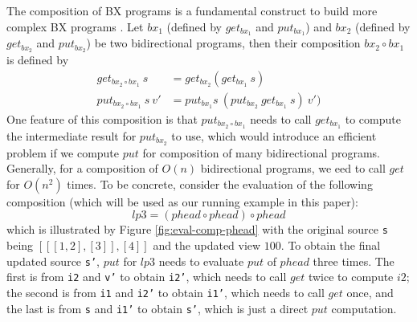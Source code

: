 The composition of BX programs is a fundamental construct to build more complex BX programs \cite{Bohannon06relationallenses:, Bohannon:2008:BRL:1328438.1328487}. Let $bx_1$ (defined by $get_{bx_1}$ and $put_{bx_1}$) and $bx_2$ (defined by $get_{bx_2}$ and $put_{bx_2}$) be two bidirectional programs, then their composition $bx_2 \circ bx_1$ is defined by
\begin{align}
get_{bx_2 \circ bx_1}~s &= get_{bx_2} (get_{bx_1}~s)\\
put_{bx_2 \circ bx_1}~s~v' &= put_{bx_1} s~(put_{bx_2}~ get_{bx_1}~s)~v')
\end{align}
One feature of this composition is that $put_{bx_2 \circ bx_1}$ needs to call $get_{bx_1}$ to compute the intermediate result for $put_{bx_2}$ to use, which would introduce an efficient problem if we compute $put$ for composition of many bidirectional programs. Generally, for a composition of $O(n)$ bidirectional programs, we eed to call $get$ for $O(n^2)$ times. To be concrete, consider the evaluation of the following composition (which will be used as our running example in this paper):
\[
lp3 = (phead \circ phead) \circ phead
\]
which is illustrated by Figure \ref{fig:eval-comp-phead} with the original source \texttt{s} being ${[[[1,2],[3]],[4]]}$ and the updated view ${100}$.
To obtain the final updated source \texttt{s'}, $put$ for $lp3$ needs to evaluate $put$ of $phead$ three times. The first is from \texttt{i2} and \texttt{v'} to obtain \texttt{i2'}, which needs to call $get$ twice to compute $i2$; the second is from \texttt{i1} and \texttt{i2'} to obtain \texttt{i1'}, which needs to call $get$ once, and the last is from \texttt{s} and \texttt{i1'} to obtain \texttt{s'}, which is just a direct $put$ computation.





